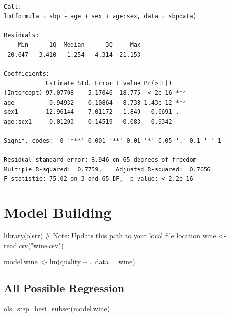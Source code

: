 \documentclass[
  letterpaper,
  DIV=11,
  numbers=noendperiod]{scrreprt}
\newenvironment{Shaded}{\begin{snugshade}}{\end{snugshade}}
\newcommand{\AttributeTok}[1]{\textcolor[rgb]{0.40,0.45,0.13}{#1}}
\newcommand{\CommentTok}[1]{\textcolor[rgb]{0.37,0.37,0.37}{#1}}
\newcommand{\FunctionTok}[1]{\textcolor[rgb]{0.28,0.35,0.67}{#1}}
\newcommand{\NormalTok}[1]{\textcolor[rgb]{0.00,0.23,0.31}{#1}}
\newcommand{\OtherTok}[1]{\textcolor[rgb]{0.00,0.23,0.31}{#1}}
\newcommand{\SpecialCharTok}[1]{\textcolor[rgb]{0.37,0.37,0.37}{#1}}
\newcommand{\StringTok}[1]{\textcolor[rgb]{0.13,0.47,0.30}{#1}}
\begin{document}
\begin{verbatim}

Call:
lm(formula = sbp ~ age + sex + age:sex, data = sbpdata)

Residuals:
    Min      1Q  Median      3Q     Max 
-20.647  -3.410   1.254   4.314  21.153 

Coefficients:
            Estimate Std. Error t value Pr(>|t|)    
(Intercept) 97.07708    5.17046  18.775  < 2e-16 ***
age          0.94932    0.10864   8.738 1.43e-12 ***
sex1        12.96144    7.01172   1.849   0.0691 .  
age:sex1     0.01203    0.14519   0.083   0.9342    
---
Signif. codes:  0 '***' 0.001 '**' 0.01 '*' 0.05 '.' 0.1 ' ' 1

Residual standard error: 8.946 on 65 degrees of freedom
Multiple R-squared:  0.7759,    Adjusted R-squared:  0.7656 
F-statistic: 75.02 on 3 and 65 DF,  p-value: < 2.2e-16
\end{verbatim}

\section{Model Building}\label{model-building}

\begin{Shaded}
\begin{Highlighting}[]
\FunctionTok{library}\NormalTok{(olsrr)}
\CommentTok{\# Note: Update this path to your local file location}
\NormalTok{wine }\OtherTok{\textless{}{-}} \FunctionTok{read.csv}\NormalTok{(}\StringTok{"wine.csv"}\NormalTok{)}

\NormalTok{model.wine }\OtherTok{\textless{}{-}} \FunctionTok{lm}\NormalTok{(quality }\SpecialCharTok{\textasciitilde{}}\NormalTok{ ., }\AttributeTok{data =}\NormalTok{ wine)}
\end{Highlighting}
\end{Shaded}

\subsection{All Possible Regression}\label{all-possible-regression}

\begin{Shaded}
\begin{Highlighting}[]
\FunctionTok{ols\_step\_best\_subset}\NormalTok{(model.wine)}
\end{Highlighting}
\end{Shaded}
\end{document}
